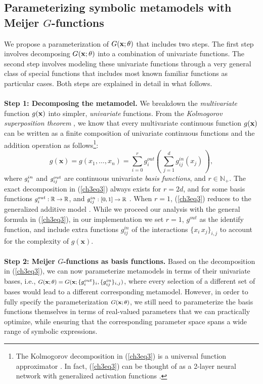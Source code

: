 \documentclass [PhD] {uclathes}
\begin{document}
\subsection{Parameterizing symbolic metamodels with Meijer $G$-functions}
\label{ch3Sec31}
We propose a parameterization of $G({\bf x};\theta)$ that includes two steps. The first step involves decomposing $G({\bf x};\theta)$ into a combination of univariate functions. The second step involves modeling these univariate functions through a very general class of special functions that includes most known familiar functions as particular cases. Both steps are explained in detail in what follows. \\   
\\
{\bf Step 1: Decomposing the metamodel.} We breakdown the {\it multivariate} function $g({\bf x})$ into simpler, {\it univariate} functions. From the {\it Kolmogorov superposition theorem} \cite{kolmogorov1957representation}, we know that every multivariate continuous function $g({\bf x})$ can be written as a finite composition of univariate continuous functions and the addition operation as follows\footnote{The Kolmogorov decomposition in (\ref{ch3eq3}) is a universal function approximator \cite{hornik1989multilayer}. In fact, (\ref{ch3eq3}) can be thought of as a 2-layer neural network with generalized activation functions \cite{kuurkova1992kolmogorov, girosi1989representation, igelnik2003kolmogorov, hornik1989multilayer, cybenko1989approximation}.}:  
\begin{equation}
g(\mathbf{x}) = g(x_{1},\ldots,x_{n}) = \sum_{i=0}^{r}g^{out}_{i}\left(\,\sum_{j=1}^{d}g^{in}_{ij}(x_{j})\,\right),
\label{ch3eq3}
\end{equation}
where $\mbox{\footnotesize $g_i^{in}$}$ and $\mbox{\footnotesize $g_{ij}^{out}$}$ are continuous univariate {\it basis functions}, and $r \in \mathbb{N}_+$. The exact decomposition in (\ref{ch3eq3}) always exists for $r = 2d$, and for some basis functions $\mbox{\footnotesize $g_i^{out}: \mathbb{R} \to \mathbb{R}$}$, and $\mbox{\footnotesize $g_{ij}^{in}: [0,1] \to \mathbb{R}$}$ \cite{sprecher1993universal}. When $r=1$, (\ref{ch3eq3}) reduces to the generalized additive model \cite{hastie2017generalized}. While we proceed our analysis with the general formula in (\ref{ch3eq3}), in our implementation we set $r=1$, $g^{out}$ as the identify function, and include extra functions $g^{in}_{ij}$ of the interactions $\{x_i\,x_j\}_{i,j}$ to account for the complexity of $g(\mathbf{x})$.\\
\\ 
{\bf Step 2: Meijer $G$-functions as basis functions.} Based on the decomposition in (\ref{ch3eq3}), we can now parameterize metamodels in terms of their univariate bases, i.e., $\mbox{\footnotesize $G({\bf x};\theta) = G({\bf x};\{g^{out}_{i}\}_i, \{g^{in}_{ij}\}_{i,j})$}$, where every selection of a different set of bases would lead to a different corresponding metamodel. However, in order to fully specify the parameterization $\mbox{\footnotesize $G({\bf x};\theta)$}$, we still need to parameterize the basis functions themselves in terms of real-valued parameters that we can practically optimize, while ensuring that the corresponding parameter space spans a wide range of symbolic expressions. 
\end{document}
